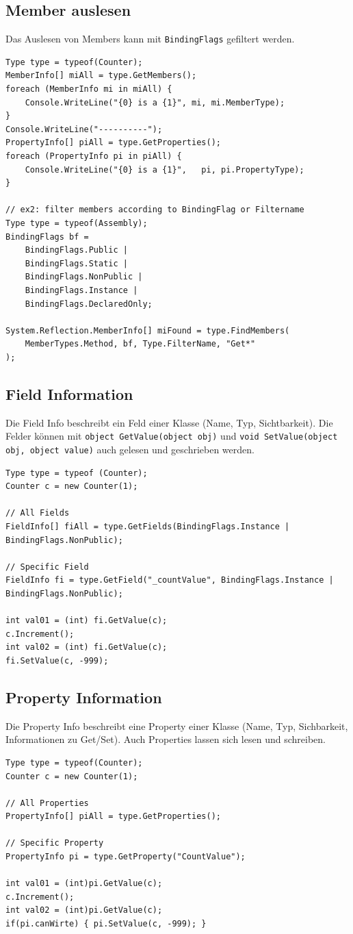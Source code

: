\documentclass[
a4paper,
oneside,
10pt,
fleqn,
headsepline,
toc=listofnumbered, 
bibliography=totocnumbered]{scrartcl}
\begin{document}
\subsection{Member auslesen}
Das Auslesen von Members kann mit \lstinline|BindingFlags| gefiltert werden.
\begin{lstlisting}[caption=Reflection: Members auslesen]
Type type = typeof(Counter);
MemberInfo[] miAll = type.GetMembers();
foreach (MemberInfo mi in miAll) {
	Console.WriteLine("{0} is a {1}", mi, mi.MemberType);
}
Console.WriteLine("----------");
PropertyInfo[] piAll = type.GetProperties();
foreach (PropertyInfo pi in piAll) {
	Console.WriteLine("{0} is a {1}",	pi, pi.PropertyType);
}

// ex2: filter members according to BindingFlag or Filtername
Type type = typeof(Assembly);
BindingFlags bf =
	BindingFlags.Public |
	BindingFlags.Static |
	BindingFlags.NonPublic |
	BindingFlags.Instance |
	BindingFlags.DeclaredOnly;

System.Reflection.MemberInfo[] miFound = type.FindMembers(
	MemberTypes.Method, bf, Type.FilterName, "Get*"
);
\end{lstlisting}

\subsection{Field Information}
Die Field Info beschreibt ein Feld einer Klasse (Name, Typ, Sichtbarkeit). Die Felder können mit \lstinline|object GetValue(object obj)| und \lstinline|void SetValue(object obj, object value)| auch gelesen und geschrieben werden.

\begin{lstlisting}[caption=Reflection: Field Info]
Type type = typeof (Counter);
Counter c = new Counter(1);

// All Fields
FieldInfo[] fiAll = type.GetFields(BindingFlags.Instance | BindingFlags.NonPublic);
	
// Specific Field
FieldInfo fi = type.GetField("_countValue", BindingFlags.Instance | 	BindingFlags.NonPublic);
	
int val01 = (int) fi.GetValue(c);
c.Increment();
int val02 = (int) fi.GetValue(c);
fi.SetValue(c, -999);
\end{lstlisting}


\subsection{Property Information}
Die Property Info beschreibt eine Property einer Klasse (Name, Typ, Sichbarkeit, Informationen zu Get/Set). Auch Properties lassen sich lesen und schreiben.
\begin{lstlisting}[caption=Reflection: Property Info]
Type type = typeof(Counter);
Counter c = new Counter(1);

// All Properties
PropertyInfo[] piAll = type.GetProperties();

// Specific Property
PropertyInfo pi = type.GetProperty("CountValue");

int val01 = (int)pi.GetValue(c);
c.Increment();
int val02 = (int)pi.GetValue(c);
if(pi.canWirte) { pi.SetValue(c, -999); }
\end{lstlisting}
\end{document}
